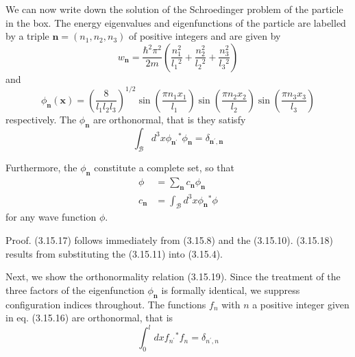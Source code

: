 \documentclass{article}
\begin{document}
We can now write down the solution of the Schroedinger problem of the particle in the box. The energy eigenvalues and eigenfunctions of the particle are labelled by a triple $\boldsymbol{n}=\left(n_{1}, n_{2}, n_{3}\right)$ of positive integers and are given by
$$
\begin{equation*}
w_{\boldsymbol{n}}=\frac{\hbar^{2} \pi^{2}}{2 m}\left(\frac{n_{1}^{2}}{l_{1}{ }^{2}}+\frac{n_{2}^{2}}{l_{2}{ }^{2}}+\frac{n_{3}^{2}}{l_{3}{ }^{2}}\right) \tag{3.15.17}
\end{equation*}
$$
and
$$
\begin{equation*}
\phi_{\boldsymbol{n}}(\boldsymbol{x})=\left(\frac{8}{l_{1} l_{2} l_{3}}\right)^{1 / 2} \sin \left(\frac{\pi n_{1} x_{1}}{l_{1}}\right) \sin \left(\frac{\pi n_{2} x_{2}}{l_{2}}\right) \sin \left(\frac{\pi n_{3} x_{3}}{l_{3}}\right) \tag{3.15.18}
\end{equation*}
$$
respectively. The $\phi_{\boldsymbol{n}}$ are orthonormal, that is they satisfy
$$
\begin{equation*}
\int_{\mathcal{B}} d^{3} x \phi_{\boldsymbol{n}^{\prime}}{ }^{*} \phi_{\boldsymbol{n}}=\delta_{\boldsymbol{n}^{\prime}, \boldsymbol{n}} \tag{3.15.19}
\end{equation*}
$$

Furthermore, the $\phi_{\boldsymbol{n}}$ constitute a complete set, so that
$$
\begin{align*}
\phi & =\sum_{\boldsymbol{n}} c_{\boldsymbol{n}} \phi_{\boldsymbol{n}}  \tag{3.15.20}\\
c_{\boldsymbol{n}} & =\int_{\mathcal{B}} d^{3} x \phi_{\boldsymbol{n}}{ }^{*} \phi \tag{3.15.21}
\end{align*}
$$
for any wave function $\phi$.

Proof. (3.15.17) follows immediately from (3.15.8) and the (3.15.10). (3.15.18) results from substituting the (3.15.11) into (3.15.4).

Next, we show the orthonormality relation (3.15.19). Since the treatment of the three factors of the eigenfunction $\phi_{\boldsymbol{n}}$ is formally identical, we suppress configuration indices throughout. The functions $f_{n}$ with $n$ a positive integer given in eq. (3.15.16)
are orthonormal, that is
$$
\begin{equation*}
\int_{0}^{l} d x f_{n^{\prime}}{ }^{*} f_{n}=\delta_{n^{\prime}, n} \tag{3.15.22}
\end{equation*}
$$
\end{document}
